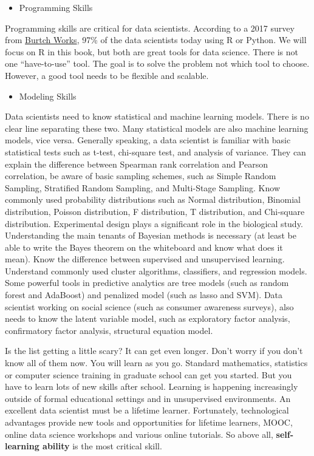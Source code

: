 \documentclass[]{book}
\providecommand{\tightlist}{%
  \setlength{\itemsep}{0pt}\setlength{\parskip}{0pt}}
\theoremstyle{definition}
\theoremstyle{definition}
\theoremstyle{remark}
\begin{document}
\begin{itemize}
\tightlist
\item
  Programming Skills
\end{itemize}

Programming skills are critical for data scientists. According to a 2017
survey from
\href{http://www.burtchworks.com/2017/06/19/2017-sas-r-python-flash-survey-results/}{Burtch
Works}, 97\% of the data scientists today using R or Python. We will
focus on R in this book, but both are great tools for data science.
There is not one ``have-to-use'' tool. The goal is to solve the problem
not which tool to choose. However, a good tool needs to be flexible and
scalable.

\begin{itemize}
\tightlist
\item
  Modeling Skills
\end{itemize}

Data scientists need to know statistical and machine learning models.
There is no clear line separating these two. Many statistical models are
also machine learning models, vice versa. Generally speaking, a data
scientist is familiar with basic statistical tests such as t-test,
chi-square test, and analysis of variance. They can explain the
difference between Spearman rank correlation and Pearson correlation, be
aware of basic sampling schemes, such as Simple Random Sampling,
Stratified Random Sampling, and Multi-Stage Sampling. Know commonly used
probability distributions such as Normal distribution, Binomial
distribution, Poisson distribution, F distribution, T distribution, and
Chi-square distribution. Experimental design plays a significant role in
the biological study. Understanding the main tenants of Bayesian methods
is necessary (at least be able to write the Bayes theorem on the
whiteboard and know what does it mean). Know the difference between
supervised and unsupervised learning. Understand commonly used cluster
algorithms, classifiers, and regression models. Some powerful tools in
predictive analytics are tree models (such as random forest and
AdaBoost) and penalized model (such as lasso and SVM). Data scientist
working on social science (such as consumer awareness surveys), also
needs to know the latent variable model, such as exploratory factor
analysis, confirmatory factor analysis, structural equation model.

Is the list getting a little scary? It can get even longer. Don't worry
if you don't know all of them now. You will learn as you go. Standard
mathematics, statistics or computer science training in graduate school
can get you started. But you have to learn lots of new skills after
school. Learning is happening increasingly outside of formal educational
settings and in unsupervised environments. An excellent data scientist
must be a lifetime learner. Fortunately, technological advantages
provide new tools and opportunities for lifetime learners, MOOC, online
data science workshops and various online tutorials. So above all,
\textbf{self-learning ability} is the most critical skill.
\end{document}
